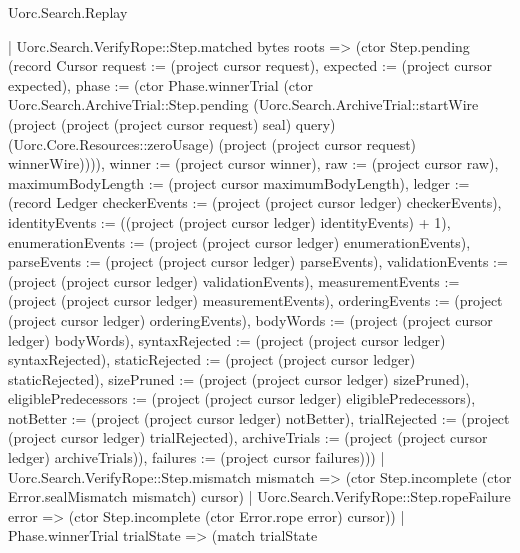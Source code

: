 \begin{lexlean}{Uorc.Search.Replay}
\begin{semanticmodule}
{      | Uorc.Search.VerifyRope::Step.matched bytes roots => (ctor Step.pending (record Cursor {request := (project cursor request), expected := (project cursor expected), phase := (ctor Phase.winnerTrial (ctor Uorc.Search.ArchiveTrial::Step.pending (Uorc.Search.ArchiveTrial::startWire (project (project (project cursor request) seal) query) (Uorc.Core.Resources::zeroUsage) (project (project cursor request) winnerWire)))), winner := (project cursor winner), raw := (project cursor raw), maximumBodyLength := (project cursor maximumBodyLength), ledger := (record Ledger {checkerEvents := (project (project cursor ledger) checkerEvents), identityEvents := ((project (project cursor ledger) identityEvents) + 1), enumerationEvents := (project (project cursor ledger) enumerationEvents), parseEvents := (project (project cursor ledger) parseEvents), validationEvents := (project (project cursor ledger) validationEvents), measurementEvents := (project (project cursor ledger) measurementEvents), orderingEvents := (project (project cursor ledger) orderingEvents), bodyWords := (project (project cursor ledger) bodyWords), syntaxRejected := (project (project cursor ledger) syntaxRejected), staticRejected := (project (project cursor ledger) staticRejected), sizePruned := (project (project cursor ledger) sizePruned), eligiblePredecessors := (project (project cursor ledger) eligiblePredecessors), notBetter := (project (project cursor ledger) notBetter), trialRejected := (project (project cursor ledger) trialRejected), archiveTrials := (project (project cursor ledger) archiveTrials)}), failures := (project cursor failures)}))
      | Uorc.Search.VerifyRope::Step.mismatch mismatch => (ctor Step.incomplete (ctor Error.sealMismatch mismatch) cursor)
      | Uorc.Search.VerifyRope::Step.ropeFailure error => (ctor Step.incomplete (ctor Error.rope error) cursor))
    | Phase.winnerTrial trialState => (match trialState
}
\end{semanticmodule}
\end{lexlean}
